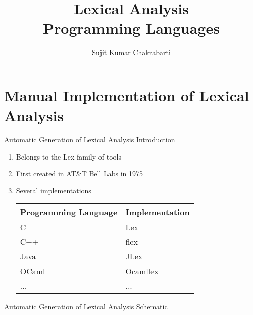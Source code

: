 \documentclass{beamer}
\title[Sujit]{Lexical Analysis \\
Programming Languages}
\author{Sujit Kumar Chakrabarti}
\institute{IIITB}
\date{}
\begin{document}
\maketitle

\section{Manual Implementation of Lexical Analysis}
\begin{frame}[fragile]{Automatic Generation of Lexical Analysis}
{Introduction}

\begin{enumerate}
\item Belongs to the Lex family of tools
\item First created in AT\&T Bell Labs in 1975
\item Several implementations

\begin{center}
\begin{scriptsize}
\begin{tabular}{| l | l |}
\hline
Programming Language & Implementation \\
\hline
C & Lex \\
C++ & flex \\
Java & JLex \\
OCaml & Ocamllex \\
... & ... \\
\hline
\end{tabular}
\end{scriptsize}
\end{center}
\end{enumerate}

\end{frame}

\begin{frame}[fragile]{Automatic Generation of Lexical Analysis}
{Schematic}

\begin{center}
\end{center}
\end{frame}
\end{document}
